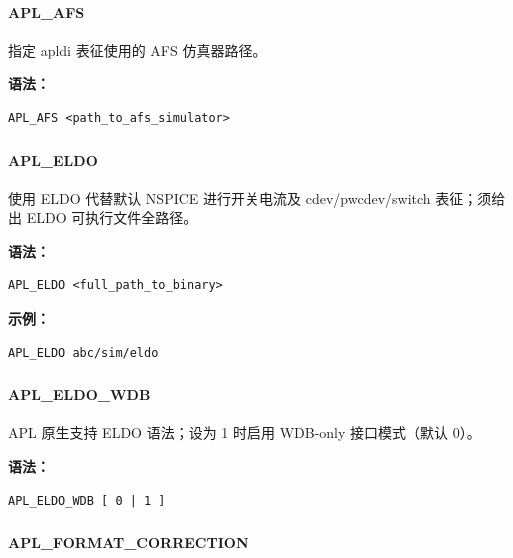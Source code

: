 \paragraph*{APL_AFS}

指定 apldi 表征使用的 AFS 仿真器路径。

\textbf{语法：}
\begin{lstlisting}
APL_AFS <path_to_afs_simulator>
\end{lstlisting}

\subsubsection{}
\paragraph*{APL_ELDO}

使用 ELDO 代替默认 NSPICE 进行开关电流及 cdev/pwcdev/switch 表征；须给出 ELDO 可执行文件全路径。

\textbf{语法：}
\begin{lstlisting}
APL_ELDO <full_path_to_binary>
\end{lstlisting}

\textbf{示例：}
\begin{lstlisting}
APL_ELDO abc/sim/eldo
\end{lstlisting}

\subsubsection{}
\paragraph*{APL_ELDO_WDB}

APL 原生支持 ELDO 语法；设为 1 时启用 WDB-only 接口模式（默认 0）。

\textbf{语法：}
\begin{lstlisting}
APL_ELDO_WDB [ 0 | 1 ]
\end{lstlisting}

\subsubsection{}
\paragraph*{APL_FORMAT_CORRECTION}

